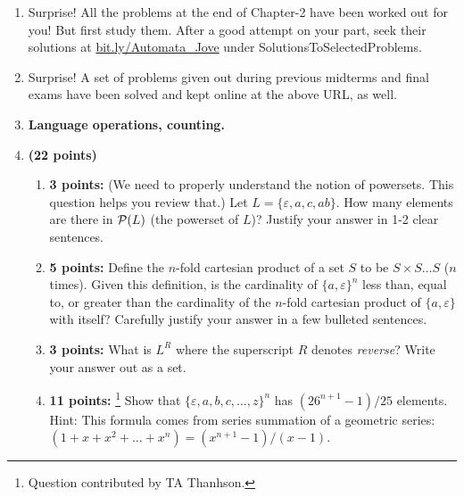 \documentclass[12pt]{article}
\begin{document}
\begin{enumerate}

\item Surprise! All the problems at the end of Chapter-2 have been worked
  out for you! But first study them. After a good attempt on your
  part, seek their solutions at
  \url{bit.ly/Automata_Jove} under SolutionsToSelectedProblems.

\item Surprise! A set of problems given out during previous midterms and final
  exams have been solved and kept online at the above URL, as well.
  
  
\item[] {\bf Language operations, counting.}
  

\item{\bf (22 points)} \label{qn2}
 \begin{enumerate}
 \item {\bf 3 points:} \label{qn2a}
   (We need to properly understand the notion of powersets. This question
   helps you review that.)
   Let $L=\{\varepsilon,a,c,ab\}$. How many elements are there in
   ${\cal P}(L)$ (the powerset of $L$)? Justify your answer in 1-2 clear sentences.
    

  
  \item {\bf 5 points:} \label{qn2b}
    Define the $n$-fold cartesian product of a set $S$ to
    be $S\times S\ldots S$ ($n$ times).
    Given this definition,
    is the cardinality of $\{a,\varepsilon\}^n$
    less than, equal to, or greater than the
    cardinality of the $n$-fold cartesian product
    of $\{a,\varepsilon\}$ with itself?
    Carefully justify your answer in a few bulleted sentences.
 
   \item {\bf 3 points:} \label{qn2c}
    What is $L^R$ where the superscript
      $R$ denotes {\em reverse}? Write your answer out as a set.
 
    \item {\bf 11 points:} \label{qn2d}\footnote{Question contributed by TA Thanhson.}
      Show that $\{\varepsilon,a,b,c,\ldots,z\}^n$ has
      $(26^{n+1}-1)/25$ elements.
      Hint: This formula comes from series summation of
      a geometric series: \\$(1+x+x^2+\ldots+x^n) = (x^{n+1}-1)/(x-1)$.
 \end{enumerate}




\end{enumerate}
\end{document}
